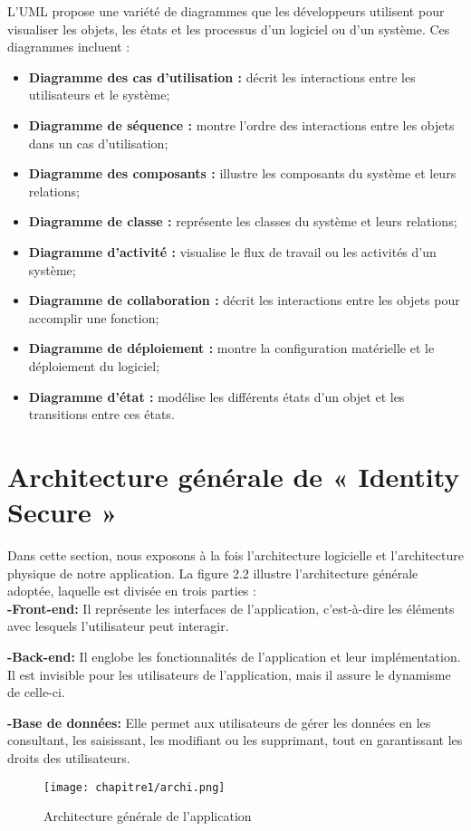 L'UML propose une variété de diagrammes que les développeurs utilisent pour visualiser les objets, les états et les processus d'un logiciel ou d'un système. Ces diagrammes incluent :
\begin{itemize}
    \item \textbf{Diagramme des cas d'utilisation :} décrit les interactions entre les utilisateurs et le système;
    \item \textbf{Diagramme de séquence :} montre l'ordre des interactions entre les objets dans un cas d'utilisation;
    \item \textbf{Diagramme des composants :} illustre les composants du système et leurs relations;
    \item \textbf{Diagramme de classe :} représente les classes du système et leurs relations;
    \item \textbf{Diagramme d'activité :} visualise le flux de travail ou les activités d'un système;
    \item \textbf{Diagramme de collaboration :} décrit les interactions entre les objets pour accomplir une fonction;
    \item \textbf{Diagramme de déploiement :} montre la configuration matérielle et le déploiement du logiciel;
    \item \textbf{Diagramme d'état :} modélise les différents états d'un objet et les transitions entre ces états.
\end{itemize}





\section{Architecture générale de « \textbf{Identity Secure} »}
Dans cette section, nous exposons à la fois l'architecture logicielle et l'architecture physique de notre application. La figure 2.2 illustre l'architecture générale adoptée, laquelle est divisée en trois parties :\\

\textbf{-Front-end:} Il représente les interfaces de l'application, c'est-à-dire les éléments avec lesquels l'utilisateur peut interagir.

\textbf{-Back-end:} Il englobe les fonctionnalités de l'application et leur implémentation. Il est invisible pour les utilisateurs de l'application, mais il assure le dynamisme de celle-ci.

\textbf{-Base de données:} Elle permet aux utilisateurs de gérer les données en les consultant, les saisissant, les modifiant ou les supprimant, tout en garantissant les droits des utilisateurs.
\begin{figure}[H]
\centering

\texttt{[image: chapitre1/archi.png]}
\caption{ Architecture générale de l'application}
\end{figure}

